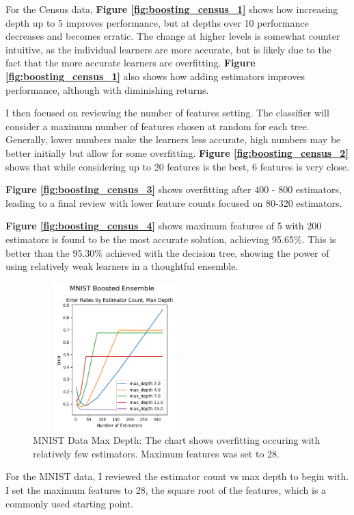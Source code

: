 \documentclass[letterpaper]{article} %
\begin{document}
For the Census data, \textbf{Figure \ref{fig:boosting_census_1}} shows how increasing depth up to 5 improves performance, but at depths over 10 performance decreases and becomes erratic.  The change at higher levels is somewhat counter intuitive, as the individual learners are more accurate, but is likely due to the fact that the more accurate learners are overfitting.  \textbf{Figure \ref{fig:boosting_census_1}} also shows how adding estimators improves performance, although with diminishing returns.  

I then focused on reviewing the number of features setting.  The classifier will consider a maximum number of features chosen at random for each tree.  Generally, lower numbers make the learners less accurate, high numbers may be better initially but allow for some overfitting. \textbf{Figure \ref{fig:boosting_census_2}}  shows that while considering up to 20 features is the best, 6 features is very close.

\textbf{Figure \ref{fig:boosting_census_3}}  shows overfitting after 400 - 800 estimators, leading to a final review with lower feature counts focused on 80-320 estimators.

\textbf{Figure \ref{fig:boosting_census_4}}  shows maximum features of 5 with 200 estimators is found to be the most accurate solution, achieving  95.65\%.  This is better than the 95.30\% achieved with the decision tree, showing the power of using relatively weak learners in a thoughtful ensemble.

\begin{figure}[h]
\centering
\includegraphics[width=2.5in, height=2.25in]{figures/MNIST_Boosted_Ensemble_boosting_1.png}
\caption{MNIST Data Max Depth:  The chart shows overfitting occuring with relatively few estimators.  Maximum features was set to 28.  }
\label{fig:boosting_mnist_1}
\end{figure}

For the MNIST data, I reviewed the estimator count vs max depth to begin with.  I set the maximum features to 28, the square root of the features, which is a commonly used starting point.
\end{document}
